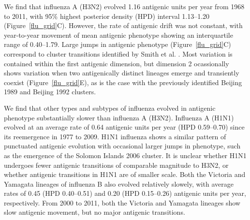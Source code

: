 \documentclass[11pt,oneside,letterpaper]{article}
\begin{document}
We find that influenza A (H3N2) evolved 1.16 antigenic units per year from 1968 to 2011, with 95\% highest posterior density (HPD) interval 1.13--1.20 (Figure~\ref{flu_grid}C).
However, the rate of antigenic drift was not constant, with year-to-year movement of mean antigenic phenotype showing an interquartile range of 0.40--1.79.  
Large jumps in antigenic phenotype (Figure~\ref{flu_grid}C) correspond to cluster transitions identified by Smith et al. \cite{Smith04}.  
Most variation is contained within the first antigenic dimension, but dimension 2 ocassionally shows variation when two antigenically distinct lineages emerge and transiently coexist (Figure~\ref{flu_grid}E), as is the case with the previously identified Beijing 1989 and Beijing 1992 clusters.

We find that other types and subtypes of influenza evolved in antigenic phenotype substantially slower than influenza A (H3N2).
Influenza A (H1N1) evolved at an average rate of 0.64 antigenic units per year (HPD 0.59--0.70) since its reemergence in 1977 to 2009.  
H1N1 influenza shows a similar pattern of punctuated antigenic evolution with occasional larger jumps in phenotype, such as the emergence of the Solomon Islands 2006 cluster.  
It is unclear whether H1N1 undergoes fewer antigenic transitions of comparable magnitude to H3N2, or whether antigenic transitions in H1N1 are of smaller scale.  
Both the Victoria and Yamagata lineages of influenza B also evolved relatively slowely, with average rates of 0.45 (HPD 0.40--0.51) and 0.20 (HPD 0.15--0.26) antigenic units per year, respectively.  
From 2000 to 2011, both the Victoria and Yamagata lineages show slow antigenic movement, but no major antigenic transitions.
\end{document}
